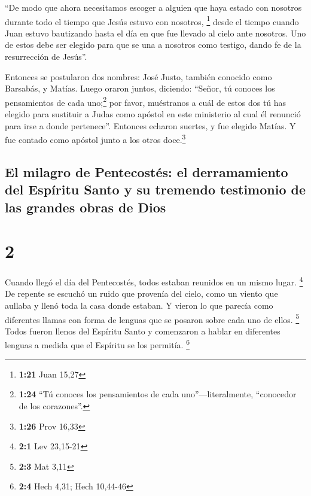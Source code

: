  ``De modo que ahora necesitamos escoger a alguien que
haya estado con nosotros durante todo el tiempo que Jesús estuvo con
nosotros, \footnote{\textbf{1:21} Juan 15,27}  desde el
tiempo cuando Juan estuvo bautizando hasta el día en que fue llevado al
cielo ante nosotros. Uno de estos debe ser elegido para que se una a
nosotros como testigo, dando fe de la resurrección de Jesús''.

 Entonces se postularon dos nombres: José Justo, también
conocido como Barsabás, y Matías.  Luego oraron juntos,
diciendo: ``Señor, tú conoces los pensamientos de cada uno;\footnote{\textbf{1:24}
  ``Tú conoces los pensamientos de cada uno''---literalmente,
  ``conocedor de los corazones''.} por favor, muéstranos a cuál de estos
dos tú has elegido  para sustituir a Judas como apóstol
en este ministerio al cual él renunció para irse a donde pertenece''.
 Entonces echaron suertes, y fue elegido Matías. Y fue
contado como apóstol junto a los otros doce.\footnote{\textbf{1:26} Prov
  16,33}

\hypertarget{el-milagro-de-pentecostuxe9s-el-derramamiento-del-espuxedritu-santo-y-su-tremendo-testimonio-de-las-grandes-obras-de-dios}{%
\subsection{El milagro de Pentecostés: el derramamiento del Espíritu
Santo y su tremendo testimonio de las grandes obras de
Dios}\label{el-milagro-de-pentecostuxe9s-el-derramamiento-del-espuxedritu-santo-y-su-tremendo-testimonio-de-las-grandes-obras-de-dios}}

\hypertarget{section-1}{%
\section{2}\label{section-1}}

 Cuando llegó el día del Pentecostés, todos estaban
reunidos en un mismo lugar. \footnote{\textbf{2:1} Lev 23,15-21}
 De repente se escuchó un ruido que provenía del cielo,
como un viento que aullaba y llenó toda la casa donde estaban.
 Y vieron lo que parecía como diferentes llamas con forma
de lenguas que se posaron sobre cada uno de ellos. \footnote{\textbf{2:3}
  Mat 3,11}  Todos fueron llenos del Espíritu Santo y
comenzaron a hablar en diferentes lenguas a medida que el Espíritu se
los permitía. \footnote{\textbf{2:4} Hech 4,31; Hech 10,44-46}

